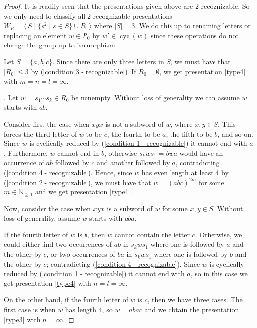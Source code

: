 \documentclass[A4paper, oneside]{amsart}
\newcommand{\N}{\mathbb{N}}
\newcommand{\mpair}[1]{\langle\, #1\,\rangle}  %
\newcommand{\cyc}{\operatorname{cyc}}
\theoremstyle{definition}
\begin{document}
\begin{proof}  It is readily seen that the presentations given above are $2$-recognizable. So we only need to classify all 2-recognizable presentations $W_R = \mpair{S \mid \{s^2 \mid s \in S\} \cup R_0}$ where $|S|=3$. We do this up to renaming letters or replacing an element $w \in R_0$ by $w' \in \cyc(w)$ since these operations do not change the group up to isomorphism.
    
    
    \smallskip
    Let $S = \{a,b,c\}$. Since there are only three letters in $S$, we must have that $|R_0| \leq 3$ by (\ref{condition 3 - recognizable}). If $R_0=\emptyset$, we get presentation \ref{type4} with $m=n=l=\infty$.

    \smallskip
    .  Let $w = s_1 \cdots s_k \in R_0$ be nonempty. Without loss of generality we can assume $w$ starts with $ab$.
    
    Consider first the case when $xyx$ is not a subword of $w$, where $x,y \in S$. This forces the third letter of $w$ to be $c$, the fourth to be $a$, the fifth to be $b$, and so on. Since $w$ is cyclically reduced by (\ref{condition 1 - recognizable}) it cannot end with $a$. Furthermore, $w$ cannot end in $b$, otherwise $s_kws_1 = bwa$ would have an occurrence of $ab$ followed by $c$ and another followed by $a$, contradicting (\ref{condition 4 - recognizable}). Hence, since $w$ has even length at least 4 by (\ref{condition 2 - recognizable}), we must have that $w=(abc)^{2m}$ for some $m \in \N_{\geq 1}$ and we get presentation \ref{type1}. 
    
    Now, consider the case when $xyx$ is a subword of $w$ for some $x,y \in S$. Without loss of generality, assume $w$ starts with $aba$. 
    
    If the fourth letter of $w$ is $b$, then $w$ cannot contain the letter $c$. Otherwise, we could either find two occurrences of $ab$ in $s_kws_1$ where one is followed by $a$ and the other by $c$, or two occurrences of $ba$ in $s_kws_1$ where one is followed by $b$ and the other by $c$; contradicting (\ref{condition 4 - recognizable}). Since $w$ is cyclically reduced by (\ref{condition 1 - recognizable}) it cannot end with $a$, so in this case we get presentation \ref{type4} with $n=l=\infty$. 
    
    On the other hand, if the fourth letter of $w$ is $c$, then we have three cases. The first case is when $w$ has length 4, so $w=abac$ and we obtain the presentation \ref{type3} with $n=\infty$. 
    

\end{proof}
\end{document}
